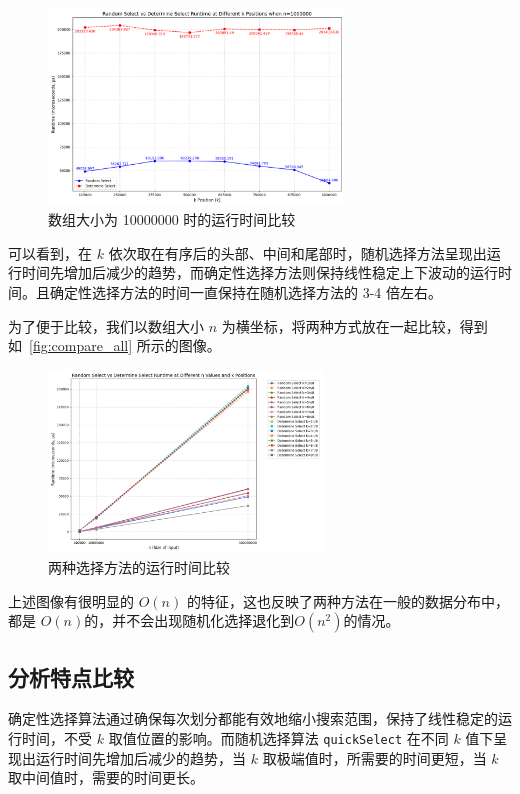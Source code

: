 \begin{figure}[H]
    \centering
    \includegraphics[width=0.7\textwidth]{../figure/10000000.png}
    \caption{数组大小为 10000000 时的运行时间比较}
\end{figure}

可以看到，在 $k$ 依次取在有序后的头部、中间和尾部时，随机选择方法呈现出运行时间先增加后减少的趋势，而确定性选择方法则保持线性稳定上下波动的运行时间。且确定性选择方法的时间一直保持在随机选择方法的 3-4 倍左右。

为了便于比较，我们以数组大小 $n$ 为横坐标，将两种方式放在一起比较，得到如~\autoref{fig:compare_all} 所示的图像。
\begin{figure}[H]
    \centering
    \includegraphics[width=0.65\textwidth]{../figure/compare_all.png}
    \caption{两种选择方法的运行时间比较}
    \label{fig:compare_all}
\end{figure}

上述图像有很明显的 $O(n)$ 的特征，这也反映了两种方法在一般的数据分布中，都是 $O(n)$的，并不会出现随机化选择退化到$O(n^2)$的情况。

\subsection{分析特点比较}
确定性选择算法通过确保每次划分都能有效地缩小搜索范围，保持了线性稳定的运行时间，不受 $k$ 取值位置的影响。而随机选择算法 \texttt{quickSelect} 在不同 $k$ 值下呈现出运行时间先增加后减少的趋势，当 $k$ 取极端值时，所需要的时间更短，当 $k$ 取中间值时，需要的时间更长。

